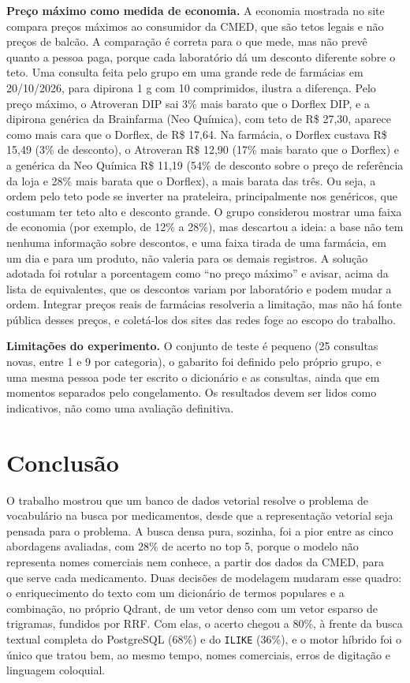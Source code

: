 \documentclass[12pt,oneside,a4paper,english,brazil]{abntex2}
\newcommand{\campo}[1]{\texttt{#1}}
\begin{document}
\textbf{Preço máximo como medida de economia.} A economia mostrada no site compara preços máximos ao consumidor da CMED, que são tetos legais e não preços de balcão. A comparação é correta para o que mede, mas não prevê quanto a pessoa paga, porque cada laboratório dá um desconto diferente sobre o teto. Uma consulta feita pelo grupo em uma grande rede de farmácias em 20/10/2026, para dipirona 1 g com 10 comprimidos, ilustra a diferença. Pelo preço máximo, o Atroveran DIP sai 3\% mais barato que o Dorflex DIP, e a dipirona genérica da Brainfarma (Neo Química), com teto de R\$ 27,30, aparece como mais cara que o Dorflex, de R\$ 17,64. Na farmácia, o Dorflex custava R\$ 15,49 (3\% de desconto), o Atroveran R\$ 12,90 (17\% mais barato que o Dorflex) e a genérica da Neo Química R\$ 11,19 (54\% de desconto sobre o preço de referência da loja e 28\% mais barata que o Dorflex), a mais barata das três. Ou seja, a ordem pelo teto pode se inverter na prateleira, principalmente nos genéricos, que costumam ter teto alto e desconto grande. O grupo considerou mostrar uma faixa de economia (por exemplo, de 12\% a 28\%), mas descartou a ideia: a base não tem nenhuma informação sobre descontos, e uma faixa tirada de uma farmácia, em um dia e para um produto, não valeria para os demais registros. A solução adotada foi rotular a porcentagem como ``no preço máximo'' e avisar, acima da lista de equivalentes, que os descontos variam por laboratório e podem mudar a ordem. Integrar preços reais de farmácias resolveria a limitação, mas não há fonte pública desses preços, e coletá-los dos sites das redes foge ao escopo do trabalho.

\textbf{Limitações do experimento.} O conjunto de teste é pequeno (25 consultas novas, entre 1 e 9 por categoria), o gabarito foi definido pelo próprio grupo, e uma mesma pessoa pode ter escrito o dicionário e as consultas, ainda que em momentos separados pelo congelamento. Os resultados devem ser lidos como indicativos, não como uma avaliação definitiva.

\chapter{Conclusão}

O trabalho mostrou que um banco de dados vetorial resolve o problema de vocabulário na busca por medicamentos, desde que a representação vetorial seja pensada para o problema. A busca densa pura, sozinha, foi a pior entre as cinco abordagens avaliadas, com 28\% de acerto no top 5, porque o modelo não representa nomes comerciais nem conhece, a partir dos dados da CMED, para que serve cada medicamento. Duas decisões de modelagem mudaram esse quadro: o enriquecimento do texto com um dicionário de termos populares e a combinação, no próprio Qdrant, de um vetor denso com um vetor esparso de trigramas, fundidos por RRF. Com elas, o acerto chegou a 80\%, à frente da busca textual completa do PostgreSQL (68\%) e do \campo{ILIKE} (36\%), e o motor híbrido foi o único que tratou bem, ao mesmo tempo, nomes comerciais, erros de digitação e linguagem coloquial.
\end{document}
